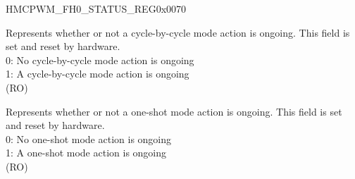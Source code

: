 \begin{register}{H}{MCPWM\_FH0\_STATUS\_REG}{0x0070}\label{regdesc:MCPWMFH0STATUSREG}
%
%
%
\regnewline%
\begin{regdesc}\begin{reglist}
\label{fielddesc:MCPWMFH0CBCON}\item [MCPWM\_FH0\_CBC\_ON] Represents whether or not a cycle-by-cycle mode action is ongoing. This field is set and reset by hardware.\\
0: No cycle-by-cycle mode action is ongoing\\
1: A cycle-by-cycle mode action is ongoing\\
(RO)
\label{fielddesc:MCPWMFH0OSTON}\item [MCPWM\_FH0\_OST\_ON] Represents whether or not a one-shot mode action is ongoing. This field is set and reset by hardware. \\
0: No one-shot mode action is ongoing\\
1: A one-shot mode action is ongoing\\
(RO)
\end{reglist}\end{regdesc}
\end{register}


